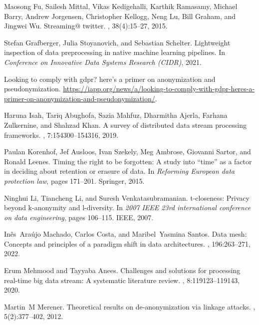 \documentclass[11pt]{article} %
\begin{document}
\begin{thebibliography}{10}
\begin{small}
Maosong Fu, Sailesh Mittal, Vikas Kedigehalli, Karthik Ramasamy, Michael Barry,
  Andrew Jorgensen, Christopher Kellogg, Neng Lu, Bill Graham, and Jingwei Wu.
\newblock Streaming@ twitter.
, 38(4):15--27, 2015.

Stefan Grafberger, Julia Stoyanovich, and Sebastian Schelter.
\newblock Lightweight inspection of data preprocessing in native machine
  learning pipelines.
\newblock In {\em Conference on Innovative Data Systems Research (CIDR)}, 2021.

Looking to comply with gdpr? here's a primer on anonymization and pseudonymization.
\newblock
  \url{https://iapp.org/news/a/looking-to-comply-with-gdpr-heres-a-primer-on-anonymization-and-pseudonymization/}.

Haruna Isah, Tariq Abughofa, Sazia Mahfuz, Dharmitha Ajerla, Farhana
  Zulkernine, and Shahzad Khan.
\newblock A survey of distributed data stream processing frameworks.
, 7:154300--154316, 2019.

Paulan Korenhof, Jef Ausloos, Ivan Szekely, Meg Ambrose, Giovanni Sartor, and
  Ronald Leenes.
\newblock Timing the right to be forgotten: A study into “time” as a factor
  in deciding about retention or erasure of data.
\newblock In {\em Reforming European data protection law}, pages 171--201.
  Springer, 2015.

Ninghui Li, Tiancheng Li, and Suresh Venkatasubramanian.
\newblock t-closeness: Privacy beyond k-anonymity and l-diversity.
\newblock In {\em 2007 IEEE 23rd international conference on data engineering},
  pages 106--115. IEEE, 2007.

In{\^e}s~Ara{\'u}jo Machado, Carlos Costa, and Maribel~Yasmina Santos.
\newblock Data mesh: Concepts and principles of a paradigm shift in data
  architectures.
, 196:263--271, 2022.

Erum Mehmood and Tayyaba Anees.
\newblock Challenges and solutions for processing real-time big data stream: A
  systematic literature review.
, 8:119123--119143, 2020.

Martin~M Merener.
\newblock Theoretical results on de-anonymization via linkage attacks.
, 5(2):377--402, 2012.


\end{small}
\end{thebibliography}
\end{document}
